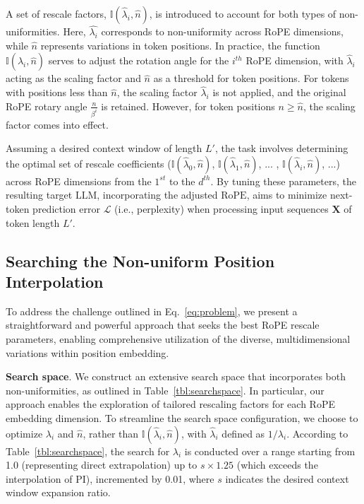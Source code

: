 A set of rescale factors, $\mathbb{I}(\hat{\lambda}_{i},\hat{n})$, is introduced to account for both types of non-uniformities. Here, $\hat{\lambda_i}$ corresponds to non-uniformity across RoPE dimensions, while $\hat{n}$ represents variations in token positions. In practice, the function $\mathbb{I}(\hat{\lambda}_{i},\hat{n})$ serves to adjust the rotation angle for the $i^{th}$ RoPE dimension, with $\hat{\lambda}_i$ acting as the scaling factor and $\hat{n}$ as a threshold for token positions. For tokens with positions less than $\hat{n}$, the scaling factor $\hat{\lambda}_{i}$ is not applied, and the original RoPE rotary angle $\frac{n}{\beta^i}$ is retained. However, for token positions $n\ge\hat{n}$, the scaling factor comes into effect.

Assuming a desired context window of length $L'$, the task involves determining the optimal set of rescale coefficients ($\mathbb{I}(\hat{\lambda}_{0},\hat{n})$, $\mathbb{I}(\hat{\lambda}_{1},\hat{n})$, ... , $\mathbb{I}(\hat{\lambda}_{i},\hat{n})$, ...) across RoPE dimensions from the $1^{st}$ to the $d^{th}$. By tuning these parameters, the resulting target $\text{LLM}$, incorporating the adjusted $\text{RoPE}$, aims to minimize next-token prediction error $\mathcal{L}$ (i.e., perplexity) when processing input sequences $\mathbf{X}$ of token length $L'$.

\subsection{Searching the Non-uniform Position Interpolation}

To address the challenge outlined in Eq.~\ref{eq:problem}, we present a straightforward and powerful approach that seeks the best RoPE rescale parameters, enabling comprehensive utilization of the diverse, multidimensional variations within position embedding.

\textbf{Search space}. We construct an extensive search space that incorporates both non-uniformities, as outlined in Table~\ref{tbl:searchspace}. In particular, our approach enables the exploration of tailored rescaling factors for each RoPE embedding dimension. To streamline the search space configuration, we choose to optimize $\lambda_i$ and $\hat{n}$, rather than $\mathbb{I}(\hat{\lambda}_{i},\hat{n})$, with $\hat{\lambda}_{i}$ defined as $1/\lambda_i$. According to Table~\ref{tbl:searchspace}, the search for $\lambda_i$ is conducted over a range starting from 1.0 (representing direct extrapolation) up to $s\times1.25$ (which exceeds the interpolation of PI), incremented by 0.01, where $s$ indicates the desired context window expansion ratio.


